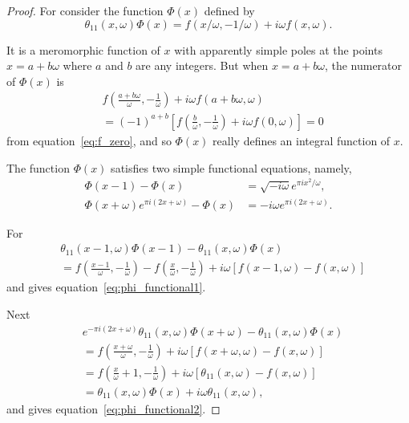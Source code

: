 \documentclass[12pt]{article}
\theoremstyle{remark}
\begin{document}
\begin{proof}
For consider the function $\Phi(x)$ defined by
\begin{equation}\label{eq:phi_def}
\theta_{11}(x, \omega) \Phi(x) = f(x/\omega, -1/\omega) + i\omega f(x, \omega).
\end{equation}

It is a meromorphic function of $x$ with apparently simple poles at the points $x = a + b\omega$ where $a$ and $b$ are any integers. But when $x = a + b\omega$, the numerator of $\Phi(x)$ is
\begin{align}
&f\left(\frac{a+b\omega}{\omega}, -\frac{1}{\omega}\right) + i\omega f(a + b\omega, \omega) \\
&= (-1)^{a+b} \left[f\left(\frac{b}{\omega}, -\frac{1}{\omega}\right) + i\omega f(0, \omega)\right] = 0
\end{align}
from equation~\eqref{eq:f_zero}, and so $\Phi(x)$ really defines an integral function of $x$.

The function $\Phi(x)$ satisfies two simple functional equations, namely,
\begin{align}
\Phi(x-1) - \Phi(x) &= \sqrt{-i\omega} e^{\pi ix^2/\omega}, \label{eq:phi_functional1}\\
\Phi(x+\omega) e^{\pi i(2x+\omega)} - \Phi(x) &= -i\omega e^{\pi i(2x+\omega)}. \label{eq:phi_functional2}
\end{align}

For
\begin{align}
&\theta_{11}(x-1, \omega) \Phi(x-1) - \theta_{11}(x, \omega) \Phi(x) \\
&= f\left(\frac{x-1}{\omega}, -\frac{1}{\omega}\right) - f\left(\frac{x}{\omega}, -\frac{1}{\omega}\right) + i\omega [f(x-1, \omega) - f(x, \omega)]
\end{align}
and gives equation~\eqref{eq:phi_functional1}.

Next
\begin{align}
&e^{-\pi i(2x+\omega)} \theta_{11}(x, \omega) \Phi(x+\omega) - \theta_{11}(x, \omega) \Phi(x) \\
&= f\left(\frac{x+\omega}{\omega}, -\frac{1}{\omega}\right) + i\omega [f(x+\omega, \omega) - f(x, \omega)] \\
&= f\left(\frac{x}{\omega} + 1, -\frac{1}{\omega}\right) + i\omega [\theta_{11}(x, \omega) - f(x, \omega)] \\
&= \theta_{11}(x, \omega) \Phi(x) + i\omega \theta_{11}(x, \omega),
\end{align}
and gives equation~\eqref{eq:phi_functional2}.


\end{proof}
\end{document}
